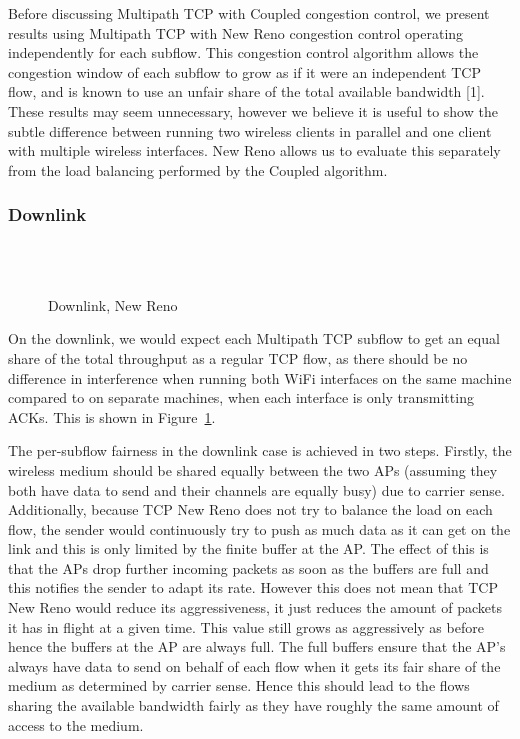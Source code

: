 Before discussing Multipath TCP with Coupled congestion control, we present
results using Multipath TCP with New Reno congestion control operating
independently for each subflow. This congestion control algorithm allows the
congestion window of each subflow to grow as if it were an independent TCP flow,
and is known to use an unfair share of the total available bandwidth [1]. These
results may seem unnecessary, however we believe it is useful to show
the subtle difference between running two wireless clients in parallel and one
client with multiple wireless interfaces. New Reno allows us to evaluate this
separately from the load balancing performed by the Coupled algorithm.


\subsubsection{Downlink}
\label{sec:results-mptcp-down}

\begin{figure}[h]
  \centering
  \\
  \subfloat[][2.4 GHz, non-overlapping channels] {\
    \scalebox{0.70}{}\label{graph:cc-reno-down}
  }
  \\
  \subfloat[][5 and 2.4 GHz] {\
    \scalebox{0.70}{}\label{graph:cb-reno-down}
  }
  \caption{Downlink, New Reno}\label{graph:reno-down}
\end{figure}

On the downlink, we would expect each Multipath TCP subflow to get an equal
share of the total throughput as a regular TCP flow, as there should be no
difference in interference when running both WiFi interfaces on the same machine
compared to on separate machines, when each interface is only transmitting ACKs.
This is shown in Figure~\ref{graph:reno-down}.

The per-subflow fairness in the downlink case is achieved in two steps. Firstly,
the wireless medium should be shared equally between the two APs (assuming they
both have data to send and their channels are equally busy) due to carrier
sense. Additionally, because TCP New Reno does not try to balance the load on
each flow, the sender would continuously try to push as much data as it can get
on the link and this is only limited by the finite buffer at the AP. The effect
of this is that the APs drop further incoming packets as soon as the buffers are
full and this notifies the sender to adapt its rate. However this does not mean
that TCP New Reno would reduce its aggressiveness, it just reduces the amount of
packets it has in flight at a given time. This value still grows as aggressively
as before hence the buffers at the AP are always full. The full buffers ensure
that the AP's always have data to send on behalf of each flow when it gets its
fair share of the medium as determined by carrier sense. Hence this should lead
to the flows sharing the available bandwidth fairly as they have roughly the
same amount of access to the medium.

